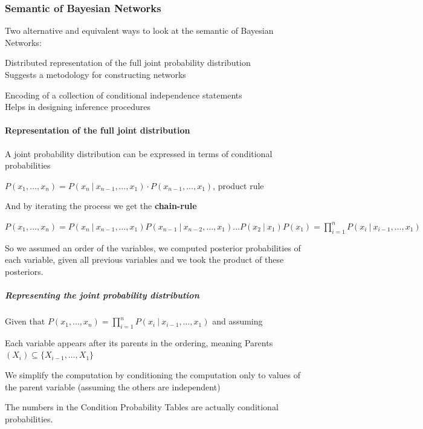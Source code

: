 \documentclass[10pt]{report}
\begin{document}
\subsubsection{Semantic of Bayesian Networks}
Two alternative and equivalent ways to look at the semantic of Bayesian Networks:
\begin{list}{}{}
	\item Distributed representation of the full joint probability distribution\\
	Suggests a metodology for constructing networks
	\item Encoding of a collection of conditional independence statements\\
	Helps in designing inference procedures
\end{list}
\paragraph{Representation of the full joint distribution} A joint probability distribution can be expressed in terms of conditional probabilities
\begin{list}{}{}
	\item $P(x_1,\ldots,x_n) = P(x_n\:|\:x_{n-1},\ldots,x_1)\cdot P(x_{n-1},\ldots,x_1)$, product rule
\end{list}
And by iterating the process we get the \textbf{chain-rule}
\begin{list}{}{}
	\item $P(x_1,\ldots,x_n) = P(x_n\:|\:x_{n-1},\ldots,x_1)P(x_{n-1}\:|\:x_{n-2},\ldots,x_1)\ldots P(x_2\:|\:x_1)P(x_1) = \prod_{i=1}^n P(x_i\:|\:x_{i-1},\ldots,x_1)$
\end{list}
So we assumed an order of the variables, we computed posterior probabilities of each variable, given all previous variables and we took the product of these posteriors.
\subparagraph{Representing the joint probability distribution} Given that $P(x_1,\ldots,x_n) = \prod_{i=1}^n P(x_i\:|\:x_{i-1},\ldots,x_1)$ and assuming\begin{list}{}{}
	\item Each variable appears after its parents in the ordering, meaning Parents$(X_i) \subseteq \{X_{i-1},\ldots,X_1\}$
	\item We simplify the computation by conditioning the computation only to values of the parent variable (assuming the others are independent)
	\item The numbers in the Condition Probability Tables are actually conditional probabilities.
\end{list}
\end{document}
